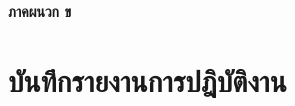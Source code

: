 \clearpage 
\thispagestyle{empty}
\begin{center}
	\LARGE{\textbf{ภาคผนวก ข}}
\end{center}

\chapter{บันทึกรายงานการปฎิบัติงาน}


